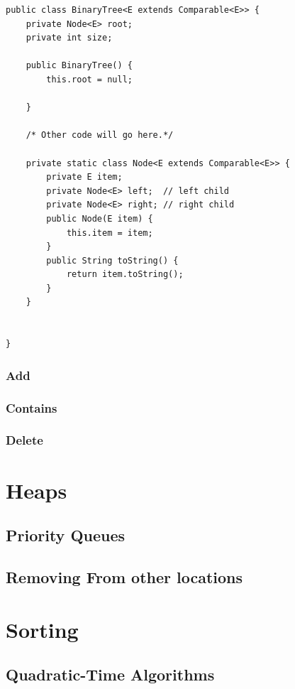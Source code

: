 \documentclass[10pt,a4paper]{book}
\begin{document}
\begin{verbatim}
public class BinaryTree<E extends Comparable<E>> {
	private Node<E> root;
	private int size;
	
	public BinaryTree() {
		this.root = null;
		
	}

	/* Other code will go here.*/

	private static class Node<E extends Comparable<E>> {
		private E item;
		private Node<E> left;  // left child
		private Node<E> right; // right child
		public Node(E item) {
			this.item = item;
		}
		public String toString() {
			return item.toString();
		}
	}

	
}
\end{verbatim}


\subsection{Add}




\subsection{Contains}

\subsection{Delete}


\chapter{Heaps}


\section{Priority Queues}

\section{Removing From other locations}

\chapter{Sorting}


\section{Quadratic-Time Algorithms}
\end{document}
